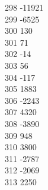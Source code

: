 { 298	-11921 \\
 299	-6525 \\
 300	130 \\
 301	71 \\
 302	-14 \\
 303	56 \\
 304	-117 \\
 305	1883 \\
 306	-2243 \\
 307	4320 \\
 308	-3890 \\
 309	948 \\
 310	3800 \\
 311	-2787 \\
 312	-2069 \\
 313	2250 \\
}

